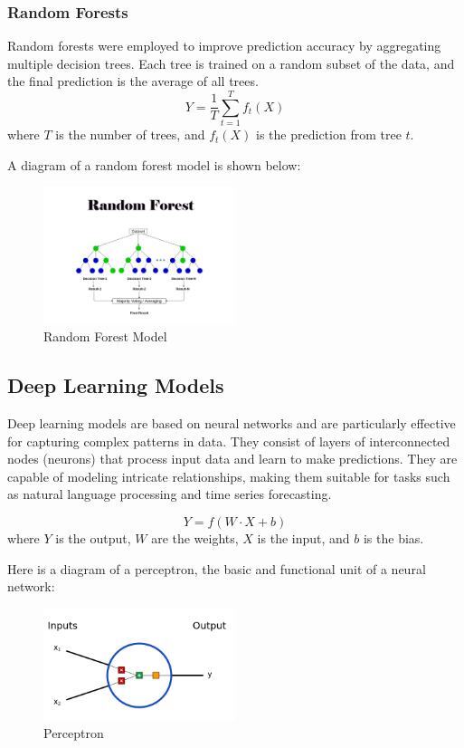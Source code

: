 \subsubsection{Random Forests}
\label{sec:random-forests}
Random forests were employed to improve prediction accuracy by aggregating multiple decision trees. Each tree is trained on a random subset of the data, and the final prediction is the average of all trees.
\begin{equation}
  Y = \frac{1}{T} \sum_{t=1}^{T} f_t(X)
\end{equation}
where $T$ is the number of trees, and $f_t(X)$ is the prediction from tree $t$.

A diagram of a random forest model is shown below:
\begin{figure}[H]
  \centering
  \includegraphics[width=0.5\textwidth]{../images/random-forest.png}
  \caption{Random Forest Model}
  \label{fig:random-forest}
\end{figure}

\subsection{Deep Learning Models}
\label{sec:deep-learning-models}
Deep learning models are based on neural networks and are particularly effective for capturing complex patterns in data. They consist of layers of interconnected nodes (neurons) that process input data and learn to make predictions. They are capable of modeling intricate relationships, making them suitable for tasks such as natural language processing and time series forecasting.

\begin{equation}
  Y = f(W \cdot X + b)
\end{equation}
where $Y$ is the output, $W$ are the weights, $X$ is the input, and $b$ is the bias.

Here is a diagram of a perceptron, the basic and functional unit of a neural network:
\begin{figure}[H]
  \centering
  \includegraphics[width=0.5\textwidth]{../images/perceptron.png}
  \caption{Perceptron}
  \label{fig:perceptron}
\end{figure}

